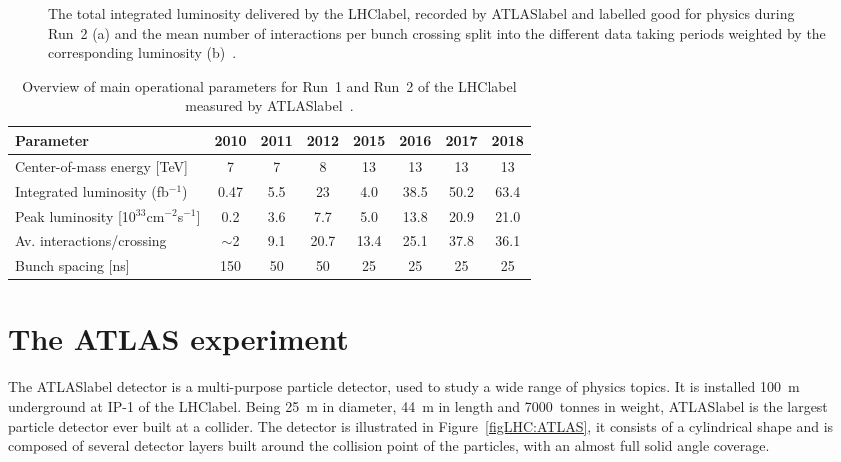 \begin{figure}[htbp]
    \RawFloats
    \begin{center}
    \quad
    \caption{
        The total integrated luminosity delivered by the \acrshort{LHClabel}, recorded by \acrshort{ATLASlabel} and labelled good for physics during Run~2 (a) and the mean number of interactions per bunch crossing split into the different data taking periods weighted by the corresponding luminosity (b)~\cite{publiclumi}. 
    }
    \label{figLHC:lumipileup}
    \end{center}
\end{figure}

\begin{table}[htbp]
    \begin{tabular}{l|ccccccc}
    \toprule\toprule
    Parameter                                        & 2010    & 2011 & 2012 & 2015 & 2016 & 2017 & 2018 \\     \midrule
    Center-of-mass energy [TeV]                                  & 7       & 7    & 8    & 13   & 13   & 13   & 13   \\
    Integrated luminosity (fb$^{-1}$)      & 0.47    & 5.5  & 23   & 4.0  & 38.5 & 50.2 & 63.4 \\
    Peak luminosity [10$^{33}$cm$^{-2}$s$^{-1}$]     & 0.2     & 3.6  & 7.7  & 5.0  & 13.8 & 20.9 & 21.0 \\
    Av. interactions/crossing                        & $\sim$2 & 9.1  & 20.7 & 13.4 & 25.1 & 37.8 & 36.1 \\
    Bunch spacing [ns]                               & 150     & 50   & 50   & 25   & 25   & 25   & 25   \\
    \bottomrule\bottomrule                               
    \end{tabular}
    \caption{Overview of main operational parameters for Run~1 and Run~2 of the \acrshort{LHClabel} measured by \acrshort{ATLASlabel}~\cite{publiclumi,publiclumiRun1}.}
    \label{tabLHC:LHCparameters}
    \end{table}

\section{The ATLAS experiment}

The \acrshort{ATLASlabel} detector is a multi-purpose particle detector, used to study a wide range of physics topics. It is installed 100~m underground at IP-1 of the \acrshort{LHClabel}. Being 25~m in diameter, 44~m in length and 7000~tonnes in weight, \acrshort{ATLASlabel} is the largest particle detector ever built at a collider. The detector is illustrated in Figure~\ref{figLHC:ATLAS}, it consists of a cylindrical shape and is composed of several detector layers built around the collision point of the particles, with an almost full solid angle coverage.

